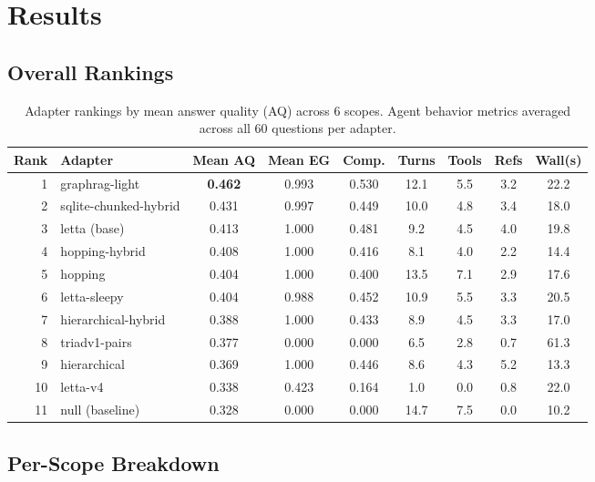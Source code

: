\documentclass[11pt,a4paper]{article}
\begin{document}
\section{Results}

\subsection{Overall Rankings}

\begin{table}[H]
\centering
\caption{Adapter rankings by mean answer quality (AQ) across 6 scopes. Agent behavior metrics averaged across all 60 questions per adapter.}
\label{tab:rankings}
\begin{tabular}{rlccccccc}
\toprule
\textbf{Rank} & \textbf{Adapter} & \textbf{Mean AQ} & \textbf{Mean EG} & \textbf{Comp.} & \textbf{Turns} & \textbf{Tools} & \textbf{Refs} & \textbf{Wall(s)} \\
\midrule
1 & \textcolor{bestgreen}{graphrag-light} & \textbf{0.462} & 0.993 & 0.530 & 12.1 & 5.5 & 3.2 & 22.2 \\
2 & sqlite-chunked-hybrid & 0.431 & 0.997 & 0.449 & 10.0 & 4.8 & 3.4 & 18.0 \\
3 & \textcolor{lettapurple}{letta (base)} & 0.413 & 1.000 & 0.481 & 9.2 & 4.5 & 4.0 & 19.8 \\
4 & hopping-hybrid & 0.408 & 1.000 & 0.416 & 8.1 & 4.0 & 2.2 & 14.4 \\
5 & hopping & 0.404 & 1.000 & 0.400 & 13.5 & 7.1 & 2.9 & 17.6 \\
6 & \textcolor{lettapurple}{letta-sleepy} & 0.404 & 0.988 & 0.452 & 10.9 & 5.5 & 3.3 & 20.5 \\
7 & hierarchical-hybrid & 0.388 & 1.000 & 0.433 & 8.9 & 4.5 & 3.3 & 17.0 \\
8 & triadv1-pairs & 0.377 & 0.000 & 0.000 & 6.5 & 2.8 & 0.7 & 61.3 \\
9 & hierarchical & 0.369 & 1.000 & 0.446 & 8.6 & 4.3 & 5.2 & 13.3 \\
10 & \textcolor{lettapurple}{letta-v4} & 0.338 & 0.423 & 0.164 & 1.0 & 0.0 & 0.8 & 22.0 \\
11 & \textcolor{nullgray}{null (baseline)} & 0.328 & 0.000 & 0.000 & 14.7 & 7.5 & 0.0 & 10.2 \\
\bottomrule
\end{tabular}
\end{table}

\subsection{Per-Scope Breakdown}
\end{document}
